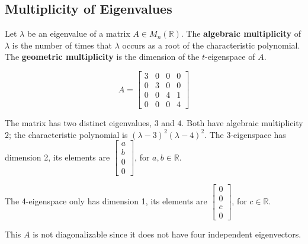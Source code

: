 \documentclass[a4paper, 9pt]{extarticle}
\begin{document}
\subsection{Multiplicity of Eigenvalues}
Let $\lambda$ be an eigenvalue of a matrix $A \in M_n(\mathbb{R})$. The \textbf{algebraic multiplicity} of $\lambda$ is the number of times that $\lambda$ occurs as a root of the characteristic polynomial. The \textbf{geometric multiplicity} is the dimension of the $t$-eigenspace of $A$.
\begin{examplebox}{}{}
  $$A = \begin{bmatrix}
      3 & 0 & 0 & 0 \\
      0 & 3 & 0 & 0 \\
      0 & 0 & 4 & 1 \\
      0 & 0 & 0 & 4
    \end{bmatrix}$$

  The matrix has two distinct eigenvalues, $3$ and $4$. Both have algebraic multiplicity $2$; the characteristic polynomial is $(\lambda - 3)^2(\lambda - 4)^2$.
  The 3-eigenspace has dimension 2, its elements are $\begin{bmatrix} a \\ b \\ 0 \\ 0 \end{bmatrix}$, for $a, b \in \mathbb{R}$.

  The 4-eigenspace only has dimension 1, its elements are $\begin{bmatrix} 0 \\ 0 \\ c \\ 0 \end{bmatrix}$, for $c \in \mathbb{R}$.

  This $A$ is not diagonalizable since it does not have four independent eigenvectors.
\end{examplebox}
\end{document}
